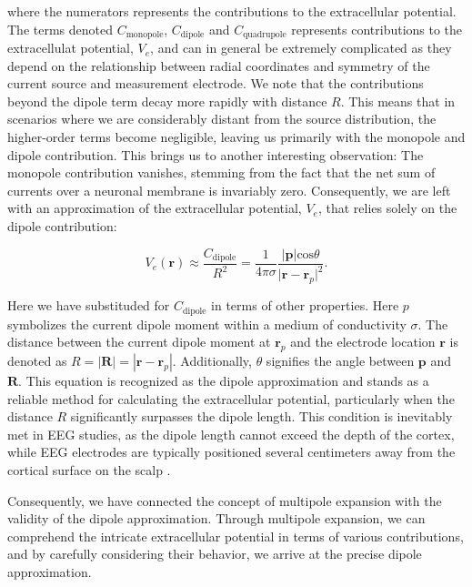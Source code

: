\documentclass[a4paper, UKenglish, 11pt]{uiomaster}
\begin{document}
where the numerators represents the contributions to the extracellular potential. The terms denoted $C_\text{monopole}$, $C_\text{dipole}$ and $C_\text{quadrupole}$ represents contributions to the extracellulat potential, $V_e$, and can in general be extremely complicated as they depend on the relationship between radial coordinates and symmetry of the current source and measurement electrode. We note that the contributions beyond the dipole term decay more rapidly with distance $R$. This means that in scenarios where we are considerably distant from the source distribution, the higher-order terms become negligible, leaving us primarily with the monopole and dipole contribution. This brings us to another interesting observation: The monopole contribution vanishes, stemming from the fact that the net sum of currents over a neuronal membrane is invariably zero. Consequently, we are left with an approximation of the extracellular potential, $V_e$, that relies solely on the dipole contribution:

\begin{equation}
V_e(\textbf{r}) \approx \frac{C_{\text{dipole}}}{R^2} = \frac{1}{4\pi\sigma}\frac{|\textbf{p}| \text{cos} \theta}{\lvert\textbf{r}-\textbf{r}_p\rvert^2}.
\label{eq:extracellular_potential_approximation}
\end{equation}

Here we have substituded for $C_\text{dipole}$ in terms of other properties. Here $p$ symbolizes the current dipole moment within a medium of conductivity $\sigma$. The distance between the current dipole moment at $\textbf{r}_p$ and the electrode location $\textbf{r}$ is denoted as $R = |\textbf{R}| = |\textbf{r} - \textbf{r}_p|$. Additionally, $\theta$ signifies the angle between $\textbf{p}$ and $\textbf{R}$. This equation is recognized as the dipole approximation and stands as a reliable method for calculating the extracellular potential, particularly when the distance $R$ significantly surpasses the dipole length. This condition is inevitably met in EEG studies, as the dipole length cannot exceed the depth of the cortex, while EEG electrodes are typically positioned several centimeters away from the cortical surface on the scalp \cite{naess2021biophysically}.

Consequently, we have connected the concept of multipole expansion with the validity of the dipole approximation. Through multipole expansion, we can comprehend the intricate extracellular potential in terms of various contributions, and by carefully considering their behavior, we arrive at the precise dipole approximation.
\end{document}
